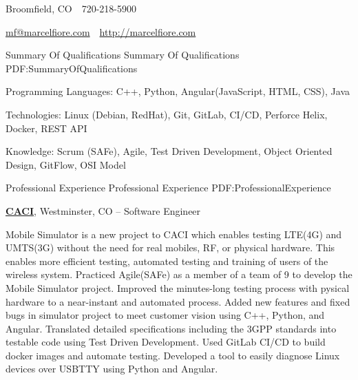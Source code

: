 \documentclass[letterpaper,MMMyyyy,nonstopmode]{simpleresumecv}
\newcommand{\CVAuthor}{Marcel Fiore}
\newcommand{\CVWebpage}{http://marcelfiore.com}
\begin{document}

\Title{\CVAuthor}

\begin{SubTitle}
Broomfield, CO
\,\SubBulletSymbol\,
720-218-5900
\par
\href{mailto:mf@marcelfiore.com}{mf@marcelfiore.com}
\,\SubBulletSymbol\,
\href{\CVWebpage}
{\url{\CVWebpage}}
\end{SubTitle}

\begin{Body}


\Section
{Summary Of Qualifications}
{Summary Of Qualifications}
{PDF:SummaryOfQualifications}

\BulletItem Programming Languages: C++, Python, Angular(JavaScript, HTML, CSS), Java

\Gap
\BulletItem Technologies: Linux (Debian, RedHat), Git, GitLab, CI/CD, Perforce Helix, Docker, REST API

\Gap
\BulletItem Knowledge: Scrum (SAFe), Agile, Test Driven Development, Object Oriented Design, GitFlow, OSI Model



\Section
{Professional Experience}
{Professional Experience}
{PDF:ProfessionalExperience}

\Entry
\href{https://www.caci.com/}{\textbf{CACI}},  Westminster, CO
\hfill
{} --
\BulletItem Software Engineer
\begin{Detail}
Mobile Simulator is a new project to CACI which enables testing LTE(4G) and UMTS(3G) without the need for real mobiles, RF, or physical hardware. This enables more efficient testing, automated testing and training of users of the wireless system.
\SubBulletItem Practiced Agile(SAFe) as a member of a team of 9 to develop the Mobile Simulator project.
\SubBulletItem Improved the minutes-long testing process with pysical hardware to a near-instant and automated process.
\SubBulletItem Added new features and fixed bugs in simulator project to meet customer vision using C++, Python, and Angular.
\SubBulletItem Translated detailed specifications including the 3GPP standards into testable code using Test Driven Development.
\SubBulletItem Used GitLab CI/CD to build docker images and automate testing.
\SubBulletItem Developed a tool to easily diagnose Linux devices over USBTTY using Python and Angular.
\end{Detail}


\end{Body}
\end{document}
